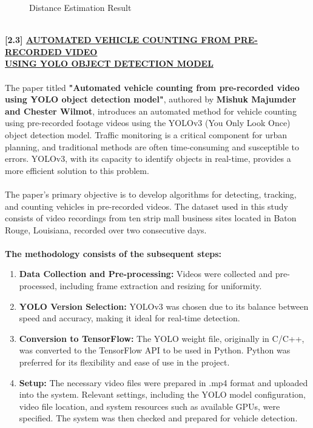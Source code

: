 {\begin{figure}[h!]
    \caption{Distance Estimation Result}
\end{figure}\\
%
%
\noindent
{\textbf{[2.3] \underline{AUTOMATED VEHICLE COUNTING FROM PRE-RECORDED VIDEO } \\ \underline{USING YOLO OBJECT DETECTION MODEL}}}\\\\
%
The paper titled \textbf{"Automated vehicle counting from pre-recorded video using YOLO object detection model"}, authored by \textbf{Mishuk Majumder and Chester Wilmot}, introduces an automated method for vehicle counting using pre-recorded footage videos using the YOLOv3 (You Only Look Once) object detection model. Traffic monitoring is a critical component for urban planning, and traditional methods are often time-consuming and susceptible to errors. YOLOv3, with its capacity to identify objects in real-time, provides a more efficient solution to this problem.\\\\
%
The paper's primary objective is to develop algorithms for detecting, tracking, and counting vehicles in pre-recorded videos. The dataset used in this study consists of video recordings from ten strip mall business sites located in Baton Rouge, Louisiana, recorded over two consecutive days.\\\\
%
\textbf{The methodology consists of the subsequent steps:}
\begin{enumerate}
  \item \textbf{Data Collection and Pre-processing:} Videos were collected and pre-processed, including frame extraction and resizing for uniformity.
  \item \textbf{YOLO Version Selection:} YOLOv3 was chosen due to its balance between speed and accuracy, making it ideal for real-time detection.
  \item \textbf{Conversion to TensorFlow:} The YOLO weight file, originally in C/C++, was converted to the TensorFlow API to be used in Python. Python was preferred for its flexibility and ease of use in the project.
  \item \textbf{Setup:} The necessary video files were prepared in .mp4 format and uploaded into the system. Relevant settings, including the YOLO model configuration, video file location, and system resources such as available GPUs, were specified. The system was then checked and prepared for vehicle detection.

\end{enumerate}}
